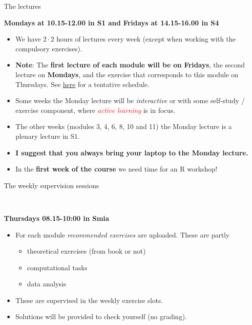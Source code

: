 \documentclass[10pt,ignorenonframetext,]{beamer}
\providecommand{\tightlist}{%
  \setlength{\itemsep}{0pt}\setlength{\parskip}{0pt}}
\begin{document}
\begin{frame}

\begin{block}{The lectures}

\vspace{2mm}

\textbf{Mondays at 10.15-12.00 in S1 and Fridays at 14.15-16.00 in S4}

\begin{itemize}
\item
  We have \(2\cdot 2\) hours of lectures every week (except when working
  with the compulsory exercises).
\item
  \textbf{Note}: The \textbf{first lecture of each module will be on
  Fridays}, the second lecture on \textbf{Mondays}, and the exercise
  that corresponds to this module on Thursdays. See
  \href{https://github.com/stefaniemuff/statlearning/blob/master/TMA4268_schedule2020.pdf}{here}
  for a tentative schedule.
\item
  Some weeks the Monday lecture will be \emph{interactive} or with some
  self-study / exercise component, where
  \emph{\textcolor{red}{active learning}} is in focus.
\item
  The other weeks (modules 3, 4, 6, 8, 10 and 11) the Monday lecture is
  a plenary lecture in S1.
\item
  \textbf{I suggest that you always bring your laptop to the Monday
  lecture.}
\item
  In the \textbf{first week of the course} we need time for an R
  workshop!
\end{itemize}

\end{block}

\end{frame}

\begin{frame}

\begin{block}{The weekly supervision sessions}

~

\textbf{Thursdays 08.15-10:00 in Smia} ~\\
\hspace*{0.333em}

\begin{itemize}
\item
  For each module \emph{recommended exercises} are uploaded. These are
  partly

  \begin{itemize}
  \tightlist
  \item
    theoretical exercises (from book or not)
  \item
    computational tasks
  \item
    data analysis
  \end{itemize}
\item
  These are supervised in the weekly exercise slots.
\item
  Solutions will be provided to check yourself (no grading).
\end{itemize}

\end{block}

\end{frame}
\end{document}

